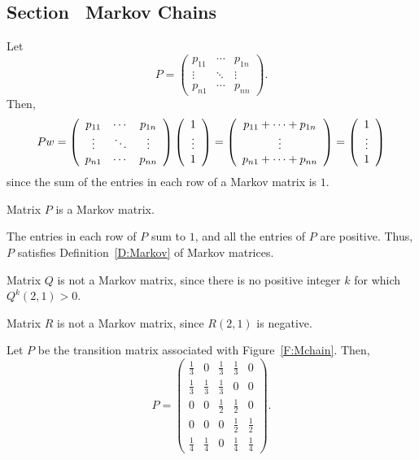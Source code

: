\documentclass{ximera}
\begin{document}
\subsection*{Section~\protect{\ref{S:TransitionApplied}} Markov Chains}

Let
\[ P = \left(\begin{array}{ccc} p_{11} & \cdots & p_{1n} \\
\vdots & \ddots & \vdots \\ p_{n1} & \cdots & p_{nn}
\end{array}\right). \]
Then,
\[ Pw = \left(\begin{array}{ccc} p_{11} & \cdots & p_{1n} \\
\vdots & \ddots & \vdots \\ p_{n1} & \cdots & p_{nn}
\end{array}\right) \left(\begin{array}{c} 1 \\ \vdots \\ 1\end{array}\right) = 
\left(\begin{array}{c} p_{11} + \cdots + p_{1n} \\ \vdots \\ p_{n1} + \cdots +
p_{nn}\end{array}\right) = \left(\begin{array}{c} 1 \\ \vdots \\ 1\end{array}\right) \]
since the sum of the entries in each row of a Markov matrix is $1$.

 \ans Matrix $P$ is a Markov matrix.

\soln The entries in each row of $P$ sum to $1$, and all the entries of
$P$ are positive.  Thus, $P$ satisfies Definition~\ref{D:Markov} of Markov
matrices.

 Matrix $Q$ is not a Markov matrix, since there is no
positive integer $k$ for which $Q^k(2,1) > 0$.

 Matrix $R$ is not a Markov matrix, since $R(2,1)$ is
negative.

Let $P$ be the transition matrix associated with Figure~\ref{F:Mchain}.
Then,
\[ P = \left(\begin{array}{rrrrr}
\frac{1}{3} & 0 & \frac{1}{3} & \frac{1}{3} & 0 \\
\frac{1}{3} & \frac{1}{3} & \frac{1}{3} & 0 & 0 \\
0 & 0 & \frac{1}{2} & \frac{1}{2} & 0 \\
0 & 0 & 0 & \frac{1}{2} & \frac{1}{2} \\
\frac{1}{4} & \frac{1}{4} & 0 & \frac{1}{4} & \frac{1}{4}
\end{array}\right). \]
\end{document}
